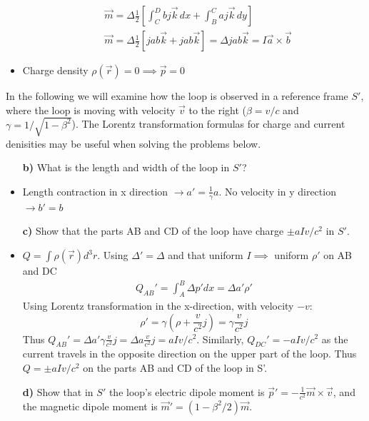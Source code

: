 \documentclass[11pt,a4paper]{report}
\newcounter{excount}[chapter]
\newenvironment{exercise}[1][]{\addtocounter{excount}{1} \noindent {\bf Problem
    \arabic{excount} \ \ #1}\hspace{2mm}}{\vspace{4mm}}
\begin{document}
\begin{exercise}
\begin{itemize}
\begin{align*}
&\vec m =  \Delta \frac{1}{2}\left[\int_C^D  bj \vec k \,dx +\int_B^C aj\vec k \,dy \right]  \\
&\vec m =  \Delta \frac{1}{2}\left[ jab \vec k + jab \vec k \right]=\Delta j ab \vec k =  I \vec a \times \vec b
\end{align*}

\item Charge density $\rho (\vec r)=0 \implies \vec{p}=0$ 

\end{itemize}

In the following we will examine how the loop is observed in a reference frame $S'$, where the loop is moving with velocity $\vec v$ to the right ($\beta=v/c$ and $\gamma=1/\sqrt{1-\beta^2}$). The Lorentz transformation formulas for charge and current denisities may be useful when solving the problems below.

\begin{itemize}
\item[{\bf b)}] What is the length and width of the loop in $S'$?
\item Length contraction in x direction $\rightarrow a'=\frac{1}{\gamma}a$. No velocity in y direction $\rightarrow b'=b$

\item[{\bf c)}]Show that the parts AB and CD of the loop have charge $\pm aIv/c^2$ in $S'$.
\item $Q=\int \rho(\vec r) d^3r$. Using $\Delta'=\Delta$ and that uniform $I \implies $ uniform $\rho'$ on AB and DC
\begin{align*}
Q_{AB}'= \int_A^B \Delta p'  dx =\Delta  a' \rho'
\end{align*}
Using Lorentz transformation in the x-direction, with velocity $-v$:
\begin{equation}
\rho'=\gamma(\rho+\frac{v}{c^2} j)=\gamma\frac{v}{c^2} j
\end{equation} 
Thus $Q_{AB}'=\Delta  a' \gamma\frac{v}{c^2} j = \Delta  a \frac{v}{c^2} j=  aI v/c^2 $.
Similarly, $Q_{DC}'= -aI v/c^2 $ as the current travels in the opposite direction on the upper part of the loop. Thus $Q=\pm aI v/c^2$ on the parts AB and CD of the loop in S'.

\item[{\bf d)}]Show that in $S'$ the loop's electric dipole moment is ${\vec p}'=-\frac{1}{c^2}\vec{m}\times\vec{v}$, and the magnetic dipole moment is $\vec{m}'=(1-\beta^2/2)\vec{m}$.



\end{itemize}
\end{exercise}
\end{document}
